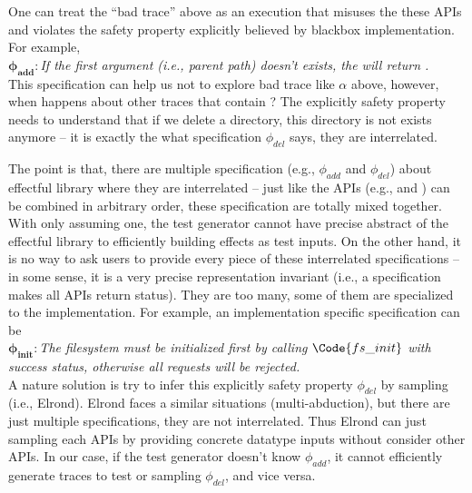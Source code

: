 One can treat the ``bad trace'' above as an execution that misuses the these APIs and violates the safety property explicitly believed by blackbox implementation. For example,\\

$\mathbf{\phi_{add}:} $\emph{If the first argument (i.e., parent path) doesn't exists, the  will return . }\\

This specification can help us not to explore bad trace like $\alpha$ above, however, when happens about other traces that contain ? The explicitly safety property needs to understand that if we delete a directory, this directory is not exists anymore -- it is exactly the what specification $\phi_{del}$ says, they are interrelated.

The point is that, there are multiple specification (e.g., $\phi_{add}$ and $\phi_{del}$) about effectful library where they are interrelated -- just like the APIs (e.g.,  and ) can be combined in arbitrary order, these specification are totally mixed together. With only assuming one, the test generator cannot have precise abstract of the effectful library to efficiently building effects as test inputs. On the other hand, it is no way to ask users to provide every piece of these interrelated specifications -- in some sense, it is a very precise representation invariant (i.e., a specification makes all APIs return  status). They are too many, some of them are specialized to the implementation. For example, an implementation specific specification can be\\

$\mathbf{\phi_{init}:} $\emph{The filesystem must be initialized first by calling $\Code{fs\_init}$ with success status, otherwise all requests will be rejected. }\\

A nature solution is try to infer this explicitly safety property $\phi_{del}$ by sampling (i.e., Elrond). Elrond faces a similar situations (multi-abduction), but there are just multiple specifications, they are not interrelated. Thus Elrond can just sampling each APIs by providing concrete datatype inputs without consider other APIs. In our case, if the test generator doesn't know $\phi_{add}$, it cannot efficiently generate traces to test or sampling $\phi_{del}$, and vice versa.

